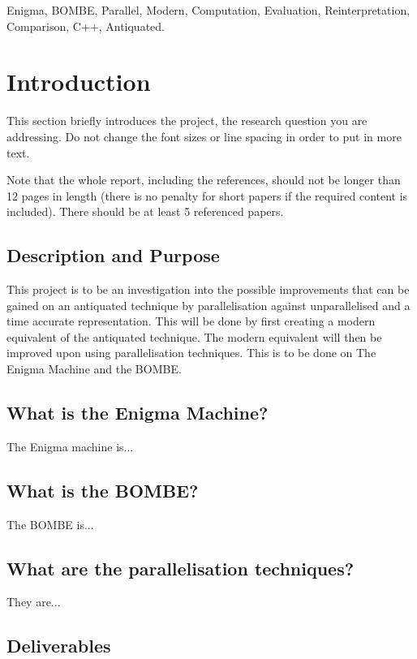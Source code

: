 \documentclass[12pt,a4paper]{article}
\begin{document}
\begin{keywords}
Enigma, BOMBE, Parallel, Modern, Computation, Evaluation, Reinterpretation, Comparison, C++, Antiquated.
\end{keywords}

\section{Introduction}
This section briefly introduces the project, the research question you are addressing.  Do not change the font sizes or line spacing in order to put in more text.

Note that the whole report, including the references, should not be longer than 12 pages in length (there is no penalty for short papers if the required content is included). There should be at least 5 referenced papers.

\subsection{Description and Purpose}

This project is to be an investigation into the possible improvements that can be gained on an antiquated technique by parallelisation against unparallelised and a time accurate representation. This will be done by first creating a modern equivalent of the antiquated technique. The modern equivalent will then be improved upon using parallelisation techniques. This is to be done on The Enigma Machine and the BOMBE.

\subsection{What is the Enigma Machine?}

The Enigma machine is...

\subsection{What is the BOMBE?}

The BOMBE is...

\subsection{What are the parallelisation techniques?}

They are...

\subsection{Deliverables}
\end{document}
